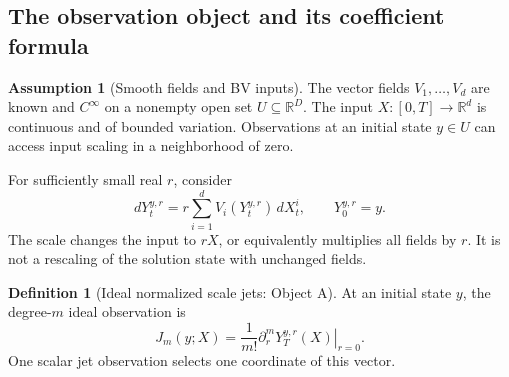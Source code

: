 \documentclass[11pt,a4paper]{article}
\numberwithin{equation}{section}
\theoremstyle{definition}
\newtheorem{definition}[theorem]{Definition}
\newtheorem{assumption}[theorem]{Assumption}
\theoremstyle{remark}
\newcommand{\R}{\mathbb R}
\begin{document}
\subsection{The observation object and its coefficient formula}
\begin{assumption}[Smooth fields and BV inputs]\label{ass:smooth}
The vector fields $V_1,\ldots,V_d$ are known and $C^\infty$ on a nonempty
open set $U\subseteq\R^D$. The input $X:[0,T]\to\R^d$ is continuous
and of bounded variation. Observations at an initial state $y\in U$ can
access input scaling in a neighborhood of zero.
\end{assumption}
For sufficiently small real $r$, consider
\begin{equation}\label{eq:CDE}
 dY_t^{y,r}=r\sum_{i=1}^dV_i(Y_t^{y,r})\,dX_t^i,
 \qquad Y_0^{y,r}=y.
\end{equation}
The scale changes the input to $rX$, or equivalently multiplies all fields
by $r$. It is not a rescaling of the solution state with unchanged fields.

\begin{definition}[Ideal normalized scale jets: Object A]
At an initial state $y$, the degree-$m$ ideal observation is
\begin{equation}\label{eq:jetdef}
 J_m(y;X)=\frac1{m!}\left.\partial_r^mY_T^{y,r}(X)\right|_{r=0}.
\end{equation}
One scalar jet observation selects one coordinate of this vector.
\end{definition}
\end{document}
